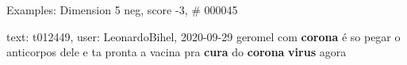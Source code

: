 \begin{frame}{Examples: Dimension 5 neg, score -3, \# 000045}
\footnotesize
\begin{alertblock}{text: t012449, user: LeonardoBihel, 2020-09-29}
geromel com \textbf{corona} é so pegar o anticorpos dele e ta pronta a vacina 
pra \textbf{cura} do \textbf{corona} \textbf{virus} agora 
\end{alertblock}
\end{frame}

